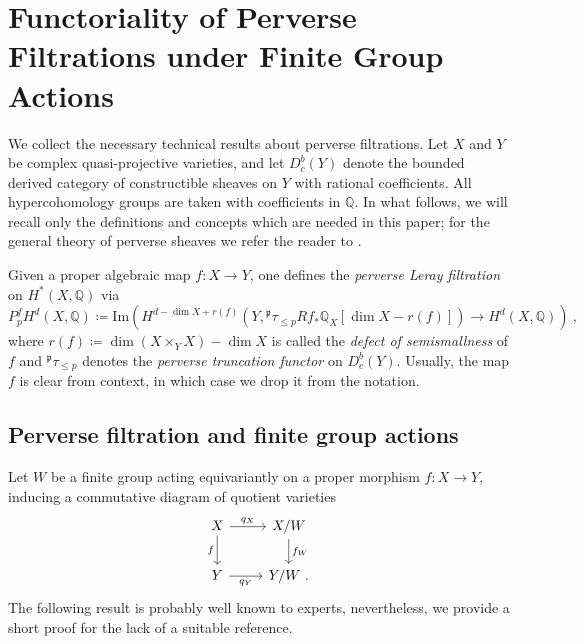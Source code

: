 \documentclass[11pt, a4paper]{amsart}
\theoremstyle{definition}
\theoremstyle{myitemstyle}
\begin{document}
\section{Functoriality of Perverse Filtrations under Finite Group Actions}\label{sec:functoriality}

We collect the necessary technical results about perverse filtrations. 
Let $X$ and $Y$ be complex quasi-projective varieties, and let $D^b_c(Y)$ denote the bounded derived category of constructible sheaves on $Y$ with rational coefficients. All hypercohomology groups are taken with coefficients in $\mathbb{Q}$. In what follows, we will recall only the definitions and concepts which are needed in this paper; for the general theory of perverse sheaves we refer the reader to \cite{BBD82, dCM09}.
	
Given a proper algebraic map $f\colon X \to Y$, one defines the \textit{perverse Leray filtration} on $H^*(X, \mathbb{Q})$ via
\begin{equation}\label{def:perversefiltration}
	P_p^f H^d(X, \mathbb{Q}) \coloneqq \mathrm{Im} \left( H^{d - \dim X + r(f)}\left( Y, {}^{\mathfrak{p}}\tau_{\le p} R f_* \mathbb{Q}_X [\dim X - r(f)] \right) \longrightarrow H^d(X, \mathbb{Q}) \right)\ ,
\end{equation}
where $r(f) \coloneqq \dim(X \times_Y X) - \dim X$ is called the \textit{defect of semismallness} of $f$ and ${}^{\mathfrak{p}}\tau_{\le p}$ denotes the \textit{perverse truncation functor} on $D^b_c(Y)$. Usually, the map $f$ is clear from context, in which case we drop it from the notation.
	
\subsection{Perverse filtration and finite group actions}
	
Let $W$ be a finite group acting equivariantly on a proper morphism $f \colon X \to Y$, inducing a commutative diagram of quotient varieties
\[
\begin{tikzcd}
    X \arrow[r, "q_X"] \arrow[d, "f"'] & X/W \arrow[d, "f_W"] \\
    Y \arrow[r, "q_Y"']               & Y/W\ .
\end{tikzcd}
\]
The following result is probably well known to experts, nevertheless,  we provide a short proof for the lack of a suitable reference.  
	
\end{document}
